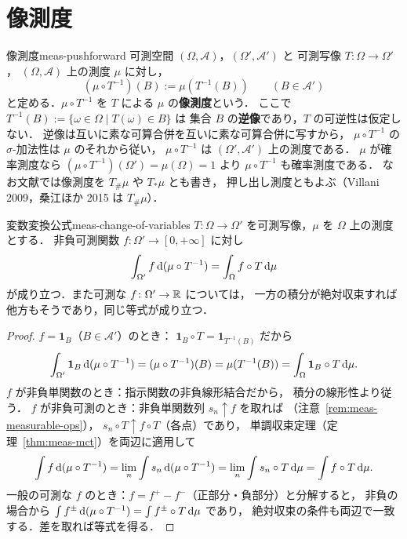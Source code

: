 \section{像測度}

\begin{definition}{像測度}{meas-pushforward}
  可測空間 $(\Omega,\mathcal{A})$，$(\Omega',\mathcal{A}')$ と
  可測写像 $T\colon\Omega\to\Omega'$，
  $(\Omega,\mathcal{A})$ 上の測度 $\mu$ に対し，
  \[
    (\mu\circ T^{-1})(B):=\mu(T^{-1}(B))
    \qquad(B\in\mathcal{A}')
  \]
  と定める．$\mu\circ T^{-1}$ を $T$ による $\mu$ の\textbf{像測度}という．
  ここで $T^{-1}(B):=\{\omega\in\Omega\mid T(\omega)\in B\}$ は
  集合 $B$ の\textbf{逆像}であり，$T$ の可逆性は仮定しない．
  逆像は互いに素な可算合併を互いに素な可算合併に写すから，
  $\mu\circ T^{-1}$ の $\sigma$-加法性は $\mu$ のそれから従い，
  $\mu\circ T^{-1}$ は $(\Omega',\mathcal{A}')$ 上の測度である．
  $\mu$ が確率測度なら
  $(\mu\circ T^{-1})(\Omega')=\mu(\Omega)=1$ より
  $\mu\circ T^{-1}$ も確率測度である．
  なお文献では像測度を $T_\#\mu$ や $T_*\mu$ とも書き， %
  押し出し測度ともよぶ（Villani 2009，桑江ほか 2015 は $T_\#\mu$）． %
\end{definition}

\begin{lemma}{変数変換公式}{meas-change-of-variables}
  $T\colon\Omega\to\Omega'$ を可測写像，$\mu$ を $\Omega$ 上の測度とする．
  非負可測関数 $f\colon\Omega'\to[0,+\infty]$ に対し
  \[
    \int_{\Omega'}f\,\mathrm{d}(\mu\circ T^{-1})
    =
    \int_\Omega f\circ T\,\mathrm{d}\mu
  \]
  が成り立つ．また可測な $f\colon\Omega'\to\mathbb{R}$ については，
  一方の積分が絶対収束すれば他方もそうであり，同じ等式が成り立つ．
\end{lemma}

\begin{proof}
  $f=\mathbf{1}_B$（$B\in\mathcal{A}'$）のとき：
  $\mathbf{1}_B\circ T=\mathbf{1}_{T^{-1}(B)}$ だから
  \[
    \int_{\Omega'}\mathbf{1}_B\,\mathrm{d}(\mu\circ T^{-1})
    =(\mu\circ T^{-1})(B)
    =\mu(T^{-1}(B))
    =\int_\Omega\mathbf{1}_B\circ T\,\mathrm{d}\mu.
  \]
  $f$ が非負単関数のとき：指示関数の非負線形結合だから，
  積分の線形性より従う．
  $f$ が非負可測のとき：非負単関数列 $s_n\uparrow f$ を取れば
  （注意~\ref{rem:meas-measurable-ops}），
  $s_n\circ T\uparrow f\circ T$（各点）であり，
  単調収束定理（定理~\ref{thm:meas-mct}）を両辺に適用して
  \[
    \int f\,\mathrm{d}(\mu\circ T^{-1})
    =\lim_n\int s_n\,\mathrm{d}(\mu\circ T^{-1})
    =\lim_n\int s_n\circ T\,\mathrm{d}\mu
    =\int f\circ T\,\mathrm{d}\mu.
  \]
  一般の可測な $f$ のとき：$f=f^+-f^-$（正部分・負部分）と分解すると，
  非負の場合から
  $\int f^\pm\,\mathrm{d}(\mu\circ T^{-1})=\int f^\pm\circ T\,\mathrm{d}\mu$ であり，
  絶対収束の条件も両辺で一致する．差を取れば等式を得る．
\end{proof}

